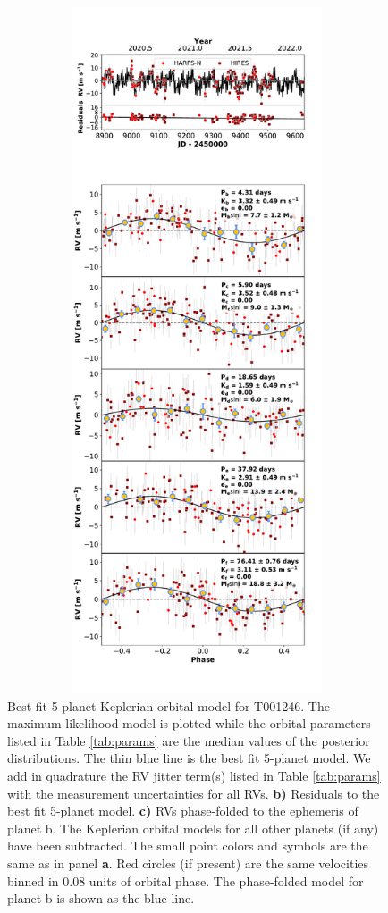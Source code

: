 \documentclass{emulateapj}
\begin{document}
\begin{figure}[!h]
\centering 

\includegraphics[height=8.0in,width=6.0in,keepaspectratio]{rdvel+harps_rv_multipanel.pdf}
\caption{ Best-fit 5-planet Keplerian orbital model
  for T001246. The maximum likelihood model is plotted while
  the orbital parameters listed in Table \ref{tab:params} are the
  median values of the posterior distributions.  The thin blue line is
  the best fit 5-planet model. We add in quadrature
  the RV jitter term(s) listed in Table \ref{tab:params} with the
  measurement uncertainties for all RVs.  {\bf b)} Residuals to the
  best fit 5-planet model. {\bf c)} RVs phase-folded
  to the ephemeris of planet b. The Keplerian orbital models for all
  other planets (if any) have been subtracted.  The small point colors
  and symbols are the same as in panel {\bf a}.  Red circles (if
  present) are the same velocities binned in 0.08 units of orbital
  phase.  The phase-folded model for planet b is shown as the blue
  line.}
\end{figure}
 
\end{document}
